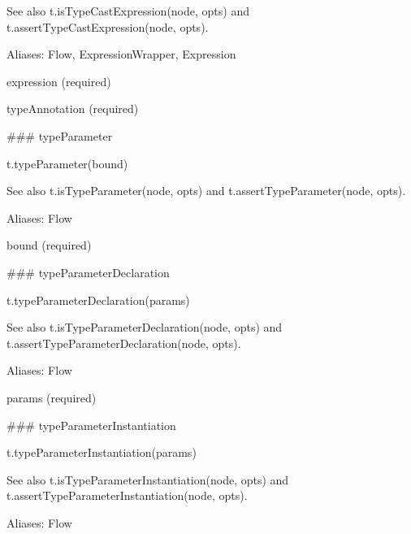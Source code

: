 See also {\ttfamily t.\+is\+Type\+Cast\+Expression(node, opts)} and {\ttfamily t.\+assert\+Type\+Cast\+Expression(node, opts)}.

Aliases\+: {\ttfamily Flow}, {\ttfamily Expression\+Wrapper}, {\ttfamily Expression}


\begin{DoxyItemize}
\item {\ttfamily expression} (required)
\item {\ttfamily type\+Annotation} (required) 


\end{DoxyItemize}

\#\#\# type\+Parameter 
\begin{DoxyCode}
t.typeParameter(bound)
\end{DoxyCode}


See also {\ttfamily t.\+is\+Type\+Parameter(node, opts)} and {\ttfamily t.\+assert\+Type\+Parameter(node, opts)}.

Aliases\+: {\ttfamily Flow}


\begin{DoxyItemize}
\item {\ttfamily bound} (required) 


\end{DoxyItemize}

\#\#\# type\+Parameter\+Declaration 
\begin{DoxyCode}
t.typeParameterDeclaration(params)
\end{DoxyCode}


See also {\ttfamily t.\+is\+Type\+Parameter\+Declaration(node, opts)} and {\ttfamily t.\+assert\+Type\+Parameter\+Declaration(node, opts)}.

Aliases\+: {\ttfamily Flow}


\begin{DoxyItemize}
\item {\ttfamily params} (required) 


\end{DoxyItemize}

\#\#\# type\+Parameter\+Instantiation 
\begin{DoxyCode}
t.typeParameterInstantiation(params)
\end{DoxyCode}


See also {\ttfamily t.\+is\+Type\+Parameter\+Instantiation(node, opts)} and {\ttfamily t.\+assert\+Type\+Parameter\+Instantiation(node, opts)}.

Aliases\+: {\ttfamily Flow}


